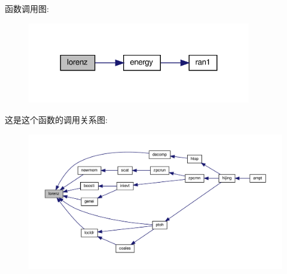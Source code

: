 函数调用图\+:
\nopagebreak
\begin{figure}[H]
\begin{center}
\leavevmode
\includegraphics[width=276pt]{lorenz_8f90_ad62cc758636257e868aab2973c7e6318_cgraph}
\end{center}
\end{figure}
这是这个函数的调用关系图\+:
\nopagebreak
\begin{figure}[H]
\begin{center}
\leavevmode
\includegraphics[width=350pt]{lorenz_8f90_ad62cc758636257e868aab2973c7e6318_icgraph}
\end{center}
\end{figure}
